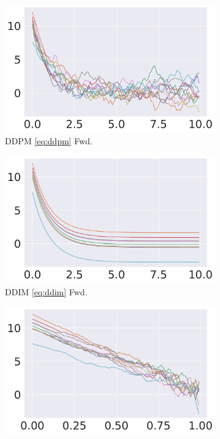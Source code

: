 \documentclass{article} %
\theoremstyle{plain}
\begin{document}
\begin{figure}[!tbh]
     \centering
     \begin{subfigure}[b]{0.24\columnwidth}
         \centering
         \includegraphics[width=\linewidth]{pics/ddpm_fwd.pdf}
        \caption{DDPM \eqref{eq:ddpm} Fwd.}
     \end{subfigure}
     \begin{subfigure}[b]{0.24\columnwidth}
         \centering
         \includegraphics[width=\linewidth]{pics/ddim-fwd.pdf}
        \caption{DDIM \eqref{eq:ddim} Fwd.}
     \end{subfigure}
     \begin{subfigure}[b]{0.24\columnwidth}
         \centering
         \includegraphics[width=\linewidth]{pics/rf-sde-fwd.pdf}

\end{subfigure}
\end{figure}
\end{document}
